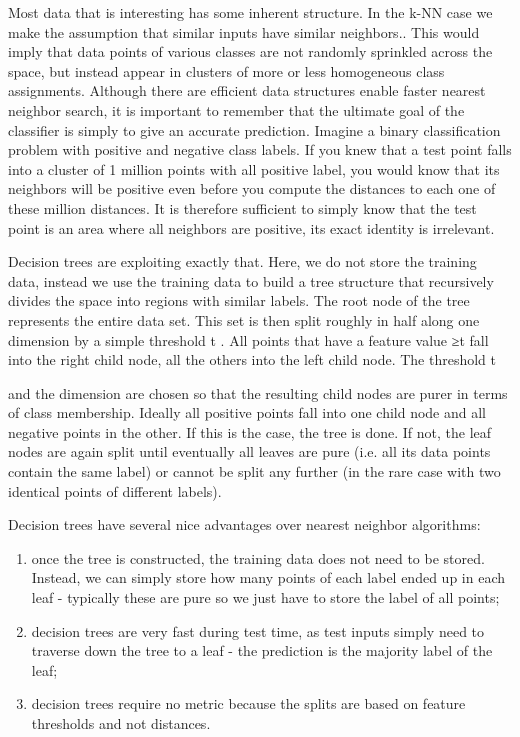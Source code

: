 \documentclass[12pt]{article}
\begin{document}
  Most data that is interesting has some inherent structure. In the k-NN case we make the assumption that similar inputs have similar neighbors.. This would imply that data points of various classes are not randomly sprinkled across the space, but instead appear in clusters of more or less homogeneous class assignments. Although there are efficient data structures enable faster nearest neighbor search, it is important to remember that the ultimate goal of the classifier is simply to give an accurate prediction. Imagine a binary classification problem with positive and negative class labels. If you knew that a test point falls into a cluster of 1 million points with all positive label, you would know that its neighbors will be positive even before you compute the distances to each one of these million distances. It is therefore sufficient to simply know that the test point is an area where all neighbors are positive, its exact identity is irrelevant.
 
 Decision trees are exploiting exactly that. Here, we do not store the training data, instead we use the training data to build a tree structure that recursively divides the space into regions with similar labels. The root node of the tree represents the entire data set. This set is then split roughly in half along one dimension by a simple threshold t
 . All points that have a feature value ≥t fall into the right child node, all the others into the left child node. The threshold t
 
 and the dimension are chosen so that the resulting child nodes are purer in terms of class membership. Ideally all positive points fall into one child node and all negative points in the other. If this is the case, the tree is done. If not, the leaf nodes are again split until eventually all leaves are pure (i.e. all its data points contain the same label) or cannot be split any further (in the rare case with two identical points of different labels).
 
 Decision trees have several nice advantages over nearest neighbor algorithms:
 
 \begin{enumerate}
 
 \item  once the tree is constructed, the training data does not need to be stored. Instead, we can simply store how many points of each label ended up in each leaf - typically these are pure so we just have to store the label of all points; \item  decision trees are very fast during test time, as test inputs simply need to traverse down the tree to a leaf - the prediction is the majority label of the leaf; \item  decision trees require no metric because the splits are based on feature thresholds and not distances.
 
  \end{enumerate}
 
\end{document}
